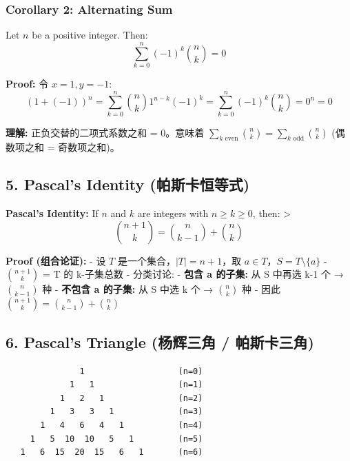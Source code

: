 \documentclass[10pt,a4paper,openany]{ctexbook}
\theoremstyle{definition}
\theoremstyle{remark}
\renewenvironment{quote}
  {\list{}{\leftmargin=1em\rightmargin=0pt\topsep=0.5pt\partopsep=0pt}\item[]}
  {\endlist}
\begin{document}
\subsubsection{Corollary 2: Alternating Sum}

\begin{quote}
Let $n$ be a positive integer. Then:
\[
\sum_{k=0}^{n} (-1)^k \binom{n}{k} = 0
\]


\textbf{Proof:} 令 $x = 1, y = -1$:
\[
(1 + (-1))^n = \sum_{k=0}^{n} \binom{n}{k} 1^{n-k} (-1)^k = \sum_{k=0}^{n} (-1)^k \binom{n}{k} = 0^n = 0
\]


\textbf{理解:} 正负交替的二项式系数之和 = 0。意味着 $\sum_{k \text{ even}} \binom{n}{k} = \sum_{k \text{ odd}} \binom{n}{k}$ (偶数项之和 = 奇数项之和)。

\end{quote}
\vspace{-2pt}

\subsection{5. Pascal's Identity (帕斯卡恒等式)}

\begin{quote}
\textbf{Pascal's Identity:} If $n$ and $k$ are integers with $n \ge k \ge 0$, then:
>
\[
\binom{n+1}{k} = \binom{n}{k-1} + \binom{n}{k}
\]


\textbf{Proof (组合论证):}
- 设 $T$ 是一个集合，$|T| = n+1$，取 $a \in T$，$S = T \setminus \{a\}$
- $\binom{n+1}{k}$ = T 的 k-子集总数
- 分类讨论:
- \textbf{包含 a 的子集:} 从 S 中再选 k-1 个 → $\binom{n}{k-1}$ 种
- \textbf{不包含 a 的子集:} 从 S 中选 k 个 → $\binom{n}{k}$ 种
- 因此 $\binom{n+1}{k} = \binom{n}{k-1} + \binom{n}{k}$

\end{quote}
\vspace{-2pt}

\subsection{6. Pascal's Triangle (杨辉三角 / 帕斯卡三角)}

{\footnotesize\begin{verbatim}
               1                   (n=0)
             1   1                 (n=1)
           1   2   1               (n=2)
         1   3   3   1             (n=3)
       1   4   6   4   1           (n=4)
     1   5  10  10   5   1         (n=5)
   1   6  15  20  15   6   1       (n=6)
\end{verbatim}}
\end{document}
